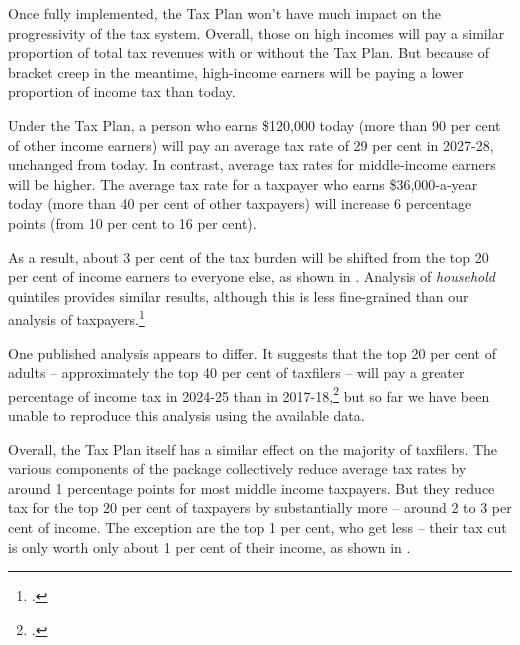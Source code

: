 \documentclass[submission]{grattan}\usepackage[]{graphicx}\usepackage[]{color}
\begin{document}
Once fully implemented, the Tax Plan won't have much impact on the progressivity of the tax system. Overall, those on high incomes will pay a similar proportion of total tax revenues with or without the Tax Plan. But because of bracket creep in the meantime, high-income earners will be paying a lower proportion of income tax than today.

Under the Tax Plan, a person who earns \$120,000 today (more than 90 per cent of other income earners) will pay an average tax rate of 29 per cent in 2027-28, unchanged from today. In contrast, average tax rates for middle-income earners will be higher. The average tax rate for a taxpayer who earns \$36,000-a-year today (more than 40 per cent of other taxpayers) will increase 6 percentage points (from 10 per cent to 16 per cent).

As a result, about 3 per cent of the tax burden will be shifted from the top 20 per cent of income earners to everyone else, as shown in . Analysis of \emph{household} quintiles provides similar results, although this is less fine-grained than our analysis of taxpayers.\footcite{Phillips2018}

One published analysis appears to differ. It suggests that the top 20 per cent of adults -- approximately the top 40 per cent of taxfilers -- will pay a greater percentage of income tax in 2024-25 than in 2017-18,\footcite{Greber} but so far we have been unable to reproduce this analysis using the available data.

Overall, the Tax Plan itself has a similar effect on the majority of taxfilers. The various components of the package collectively reduce average tax rates by around 1 percentage points for most middle income taxpayers. But they reduce tax for the top 20 per cent of taxpayers by substantially more -- around 2 to 3 per cent of income. The exception are the top 1 per cent, who get less -- their tax cut is only worth only about 1 per cent of their income, as shown in .
\end{document}
